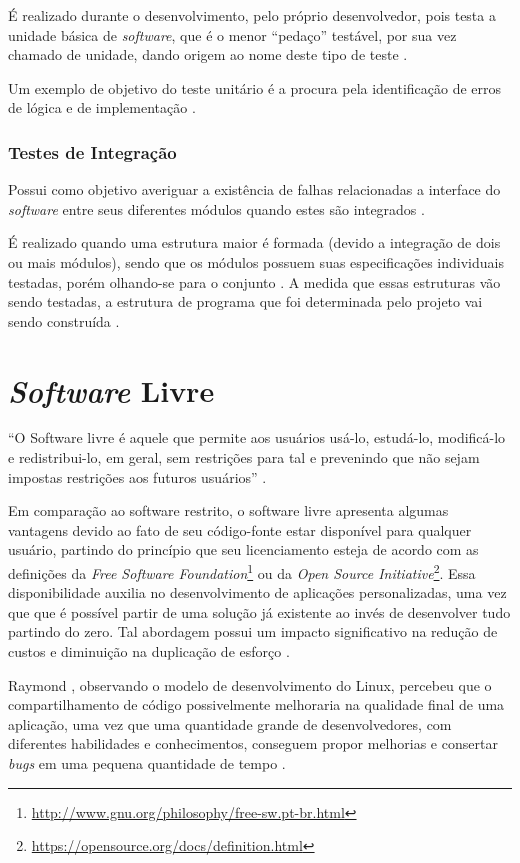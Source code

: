         É realizado durante o desenvolvimento, pelo próprio desenvolvedor, pois testa a unidade básica de \textit{software}, que é o menor ``pedaço''  testável, por sua vez chamado de unidade, dando origem ao nome deste tipo de teste \cite{sw_test_tech}.

        Um exemplo de objetivo do teste unitário é a procura pela identificação de erros de lógica e de implementação \cite{maldonado}.

        \subsubsection{Testes de Integração}
        Possui como objetivo averiguar a existência de falhas relacionadas a interface do \textit{software} entre seus diferentes módulos quando estes são integrados \cite{artigo_intro_teste}.

        É realizado quando uma estrutura maior é formada (devido a integração de dois ou mais módulos), sendo que os módulos possuem suas especificações individuais testadas, porém olhando-se para o conjunto \cite{sw_test_tech}. A medida que essas estruturas vão sendo testadas, a estrutura de programa que foi determinada pelo projeto vai sendo construída \cite{maldonado}.

\section{\textit{Software} Livre}
``O Software livre é aquele que permite aos usuários usá-lo, estudá-lo, modificá-lo e redistribui-lo, em geral, sem restrições para tal e prevenindo que não sejam impostas restrições aos futuros usuários'' \cite{meirelles2013}.

Em comparação ao software restrito, o software livre apresenta algumas vantagens devido ao fato de seu código-fonte estar disponível para qualquer usuário, partindo do princípio que seu licenciamento esteja de acordo com as definições da \textit{Free Software Foundation}\footnote{\url{http://www.gnu.org/philosophy/free-sw.pt-br.html}} ou da \textit{Open Source Initiative}\footnote{\url{https://opensource.org/docs/definition.html}}. Essa disponibilidade auxilia no desenvolvimento de aplicações personalizadas, uma vez que que é possível partir de uma solução já existente ao invés de desenvolver tudo partindo do zero. Tal abordagem possui um impacto significativo na redução de custos e diminuição na duplicação de esforço \cite{meirelles2013}.

Raymond \cite{raymond1999}, observando o modelo de desenvolvimento do Linux, percebeu que o compartilhamento de código possivelmente melhoraria na qualidade final de uma aplicação, uma vez que uma quantidade grande de desenvolvedores, com diferentes habilidades e conhecimentos, conseguem propor melhorias e consertar \textit{bugs} em uma pequena quantidade de tempo \cite{meirelles2013}.

